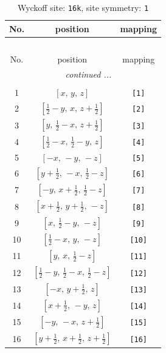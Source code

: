\documentclass[fleqn,8pt]{jsarticle}
\begin{document}
\begin{longtable}{ccc}
\caption{Wyckoff site: {\tt 16k}, site symmetry: {\tt 1}}
 \\
 \hline \hline
No. & position & mapping \\ \hline \endfirsthead

\multicolumn{2}{l}{\tablename\ \thetable{}} \\
 \hline \hline
No. & position & mapping \\ \hline \endhead

 \hline \hline
\multicolumn{2}{r}{\footnotesize\it continued ...} \\ \endfoot

 \hline \hline
\multicolumn{2}{r}{} \\ \endlastfoot

1 & $\left[ x,\, y,\, z \right]$ & {\tt [1]} \\ \hline
2 & $\left[ \frac{1}{2} - y,\, x,\, z + \frac{1}{2} \right]$ & {\tt [2]} \\ \hline
3 & $\left[ y,\, \frac{1}{2} - x,\, z + \frac{1}{2} \right]$ & {\tt [3]} \\ \hline
4 & $\left[ \frac{1}{2} - x,\, \frac{1}{2} - y,\, z \right]$ & {\tt [4]} \\ \hline
5 & $\left[ - x,\, - y,\, - z \right]$ & {\tt [5]} \\ \hline
6 & $\left[ y + \frac{1}{2},\, - x,\, \frac{1}{2} - z \right]$ & {\tt [6]} \\ \hline
7 & $\left[ - y,\, x + \frac{1}{2},\, \frac{1}{2} - z \right]$ & {\tt [7]} \\ \hline
8 & $\left[ x + \frac{1}{2},\, y + \frac{1}{2},\, - z \right]$ & {\tt [8]} \\ \hline
9 & $\left[ x,\, \frac{1}{2} - y,\, - z \right]$ & {\tt [9]} \\ \hline
10 & $\left[ \frac{1}{2} - x,\, y,\, - z \right]$ & {\tt [10]} \\ \hline
11 & $\left[ y,\, x,\, \frac{1}{2} - z \right]$ & {\tt [11]} \\ \hline
12 & $\left[ \frac{1}{2} - y,\, \frac{1}{2} - x,\, \frac{1}{2} - z \right]$ & {\tt [12]} \\ \hline
13 & $\left[ - x,\, y + \frac{1}{2},\, z \right]$ & {\tt [13]} \\ \hline
14 & $\left[ x + \frac{1}{2},\, - y,\, z \right]$ & {\tt [14]} \\ \hline
15 & $\left[ - y,\, - x,\, z + \frac{1}{2} \right]$ & {\tt [15]} \\ \hline
16 & $\left[ y + \frac{1}{2},\, x + \frac{1}{2},\, z + \frac{1}{2} \right]$ & {\tt [16]} \\
\end{longtable}
\end{document}
